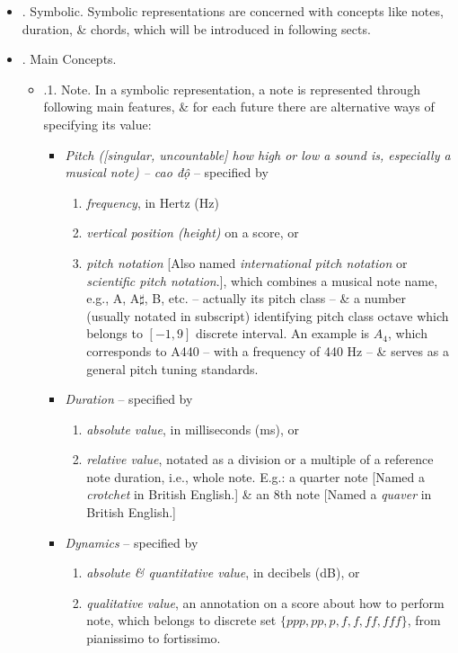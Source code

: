\documentclass{article}
\begin{document}
\begin{itemize}
\begin{itemize}
\begin{itemize}
		\end{itemize}
		\item {. Symbolic.} Symbolic representations are concerned with concepts like notes, duration, \& chords, which will be introduced in following sects.
		\item {. Main Concepts.}
		\begin{itemize}
			\item {.1. Note.} In a symbolic representation, a note is represented through following main features, \& for each future there are alternative ways of specifying its value:
			\begin{itemize}
				\item {\it Pitch ([singular, uncountable] how high or low a sound is, especially a musical note) -- cao độ} -- specified by
				\begin{enumerate}
					\item {\it frequency}, in Hertz (Hz)
					\item {\it vertical position (height)} on a score, or
					\item {\it pitch notation} [Also named {\it international pitch notation} or {\it scientiﬁc pitch notation}.], which combines a musical note name, e.g., A, A$\sharp$, B, etc. -- actually its pitch class -- \& a number (usually notated in subscript) identifying pitch class octave which belongs to $[-1,9]$ discrete interval. An example is $A_4$, which corresponds to A440 -- with a frequency of 440 Hz -- \& serves as a general pitch tuning standards.
				\end{enumerate}
				\item {\it Duration} -- specified by
				\begin{enumerate}
					\item {\it absolute value}, in milliseconds (ms), or
					\item {\it relative value}, notated as a division or a multiple of a reference note duration, i.e., whole note. E.g.: a quarter note [Named a {\it crotchet} in British English.] \& an 8th note [Named a {\it quaver} in British English.]
				\end{enumerate}
				\item {\it Dynamics} -- specified by
				\begin{enumerate}
					\item {\it absolute \& quantitative value}, in decibels (dB), or
					\item {\it qualitative value}, an annotation on a score about how to perform note, which belongs to discrete set $\{ppp,pp,p,f,f,ff,fff\}$, from pianissimo to fortissimo.

\end{enumerate}
\end{itemize}
\end{itemize}
\end{itemize}
\end{itemize}
\end{document}
